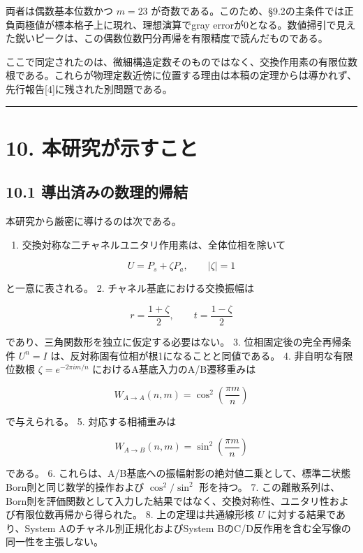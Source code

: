 \documentclass[
  a4paper,
  10pt]{article}
\providecommand{\tightlist}{%
  \setlength{\itemsep}{0pt}\setlength{\parskip}{0pt}}
\begin{document}
両者は偶数基本位数かつ \(m=23\)
が奇数である。このため、§9.2の主条件では正負両極値が標本格子上に現れ、理想演算でgray
errorが0となる。数値掃引で見えた鋭いピークは、この偶数位数円分再帰を有限精度で読んだものである。

ここで同定されたのは、微細構造定数そのものではなく、交換作用素の有限位数根である。これらが物理定数近傍に位置する理由は本稿の定理からは導かれず、先行報告{[}4{]}に残された別問題である。

\begin{center}\rule{0.5\linewidth}{0.5pt}\end{center}

\section{10.
本研究が示すこと}\label{10-ux672cux7814ux7a76ux304cux793aux3059ux3053ux3068}

\subsection{10.1
導出済みの数理的帰結}\label{101-ux5c0eux51faux6e08ux307fux306eux6570ux7406ux7684ux5e30ux7d50}

本研究から厳密に導けるのは次である。

\begin{enumerate}
\def\labelenumi{\arabic{enumi}.}
\tightlist
\item
  交換対称な二チャネルユニタリ作用素は、全体位相を除いて
\end{enumerate}

\[
U=P_s+\zeta P_a,
\qquad |\zeta|=1
\]

と一意に表される。 2. チャネル基底における交換振幅は

\[
r=\frac{1+\zeta}{2},
\qquad
t=\frac{1-\zeta}{2}
\]

であり、三角関数形を独立に仮定する必要はない。 3.
位相固定後の完全再帰条件 \(U^n=I\)
は、反対称固有位相が根1になることと同値である。 4. 非自明な有限位数根
\(\zeta=e^{-2\pi im/n}\) におけるA基底入力のA/B遷移重みは

\[
W_{A\to A}(n,m)=\cos^2\left(\frac{\pi m}{n}\right)
\]

で与えられる。 5. 対応する相補重みは

\[
W_{A\to B}(n,m)=\sin^2\left(\frac{\pi m}{n}\right)
\]

である。 6.
これらは、A/B基底への振幅射影の絶対値二乗として、標準二状態Born則と同じ数学的操作および
\(\cos^2/\sin^2\) 形を持つ。 7.
この離散系列は、Born則を評価関数として入力した結果ではなく、交換対称性、ユニタリ性および有限位数再帰から得られた。
8. 上の定理は共通線形核 \(U\) に対する結果であり、System
Aのチャネル別正規化およびSystem
BのC/D反作用を含む全写像の同一性を主張しない。
\end{document}
